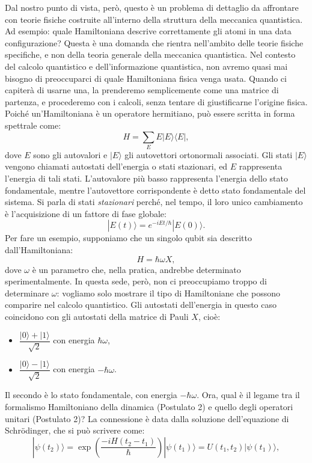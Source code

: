 \documentclass[a4paper,12pt]{report}
\theoremstyle{plain}
\begin{document}
Dal nostro punto di vista, però, questo è un problema di dettaglio da affrontare con teorie fisiche costruite all'interno della struttura della meccanica quantistica. Ad esempio: quale Hamiltoniana descrive correttamente gli atomi in una data configurazione? Questa è una domanda che rientra nell'ambito delle teorie fisiche specifiche, e non della teoria generale della meccanica quantistica.
Nel contesto del calcolo quantistico e dell'informazione quantistica, non avremo quasi mai bisogno di preoccuparci di quale Hamiltoniana fisica venga usata. Quando ci capiterà di usarne una, la prenderemo semplicemente come una matrice di partenza, e procederemo con i calcoli, senza tentare di giustificarne l'origine fisica.
Poiché un'Hamiltoniana è un operatore hermitiano, può essere scritta in forma spettrale come:
\[
H = \sum_{E} E|E\rangle\langle E|,
\]
dove \( E \) sono gli autovalori e \( |E\rangle \) gli autovettori ortonormali associati. Gli stati \( |E\rangle \) vengono chiamati autostati dell'energia o stati stazionari, ed \( E \) rappresenta l'energia di tali stati. L'autovalore più basso rappresenta l'energia dello stato fondamentale, mentre l'autovettore corrispondente è detto stato fondamentale del sistema.
Si parla di stati \textit{stazionari} perché, nel tempo, il loro unico cambiamento è l'acquisizione di un fattore di fase globale:
\[
|E(t)\rangle = e^{-iEt/\hbar}|E(0)\rangle.
\]
Per fare un esempio, supponiamo che un singolo qubit sia descritto dall'Hamiltoniana:
\[
H = \hbar\omega X,
\]
dove \(\omega\) è un parametro che, nella pratica, andrebbe determinato sperimentalmente. In questa sede, però, non ci preoccupiamo troppo di determinare \(\omega\): vogliamo solo mostrare il tipo di Hamiltoniane che possono comparire nel calcolo quantistico.
Gli autostati dell'energia in questo caso coincidono con gli autostati della matrice di Pauli \( X \), cioè:
\begin{itemize}
    \item \(\dfrac{|0\rangle + |1\rangle}{\sqrt{2}}\) con energia \(\hbar\omega\),
    \item \(\dfrac{|0\rangle - |1\rangle}{\sqrt{2}}\) con energia \(-\hbar\omega\).
\end{itemize}
Il secondo è lo stato fondamentale, con energia \(-\hbar\omega\).
Ora, qual è il legame tra il formalismo Hamiltoniano della dinamica (Postulato 2) e quello degli operatori unitari (Postulato 2)?
La connessione è data dalla soluzione dell'equazione di Schrödinger, che si può scrivere come:
\[
|\psi(t_2)\rangle = \exp\left(\frac{-iH(t_2 - t_1)}{\hbar}\right)|\psi(t_1)\rangle = U(t_1,t_2)|\psi(t_1)\rangle,
\]
\end{document}
